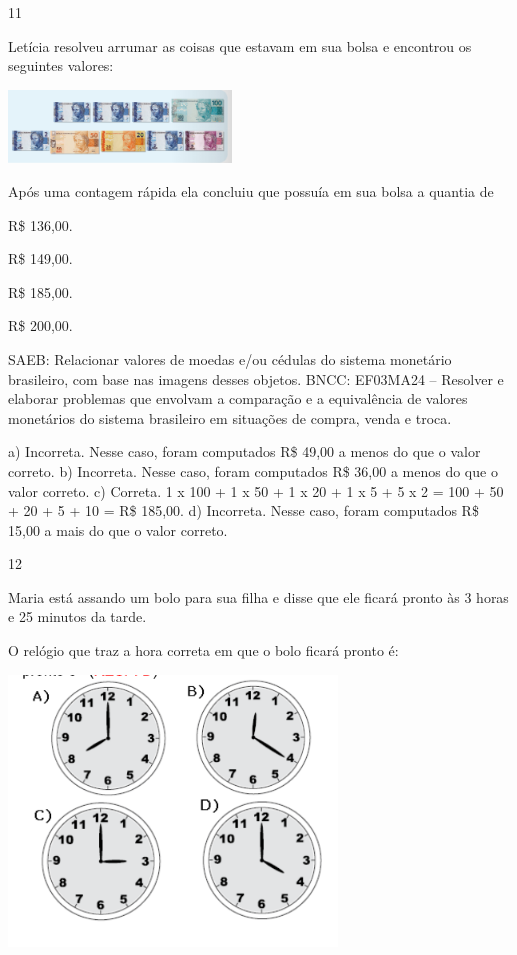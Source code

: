 \begin{multicols}{2}
{\begin{escolha}
{\num{11}

Letícia resolveu arrumar as coisas que estavam em sua bolsa e encontrou os seguintes valores:

\includegraphics[width=2.33354in,height=0.76673in]{media/image125.png}

Após uma contagem rápida ela concluiu que possuía em sua bolsa a quantia de

\begin{escolha}

\item
  R\$ 136,00.
\item
  R\$ 149,00.
\item
  R\$ 185,00.
\item
  R\$ 200,00.
\end{escolha}

SAEB: Relacionar valores de moedas e/ou cédulas do sistema monetário brasileiro, com base nas imagens desses objetos.
BNCC: EF03MA24 -- Resolver e elaborar problemas que envolvam a comparação e a equivalência de
valores monetários do sistema brasileiro em situações de compra, venda e troca.

a) Incorreta. Nesse caso, foram computados R\$ 49,00 a menos do que o valor correto.
b) Incorreta. Nesse caso, foram computados R\$ 36,00 a menos do que o valor correto.
c) Correta. 1 x 100 + 1 x 50 + 1 x 20 + 1 x 5 + 5 x 2 = 100 + 50 + 20 + 5 + 10 = R\$ 185,00.
d) Incorreta. Nesse caso, foram computados R\$ 15,00 a mais do que o valor correto.

\num{12}

Maria está assando um bolo para sua filha e disse que ele ficará pronto às 3 horas e 25 minutos da tarde.

O relógio que traz a hora correta em que o bolo ficará pronto é:


\includegraphics[width=3.44197in,height=2.84191in]{media/image126.png}

}
\end{escolha}}
\end{multicols}

